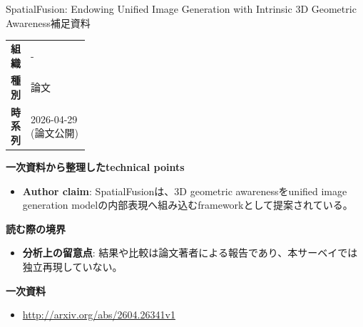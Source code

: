\begin{technicalnote}{SpatialFusion: Endowing Unified Image Generation with Intrinsic 3D Geometric Awareness}{補足資料}
\begingroup
\begin{tabularx}{\linewidth}{@{}>{\bfseries}p{0.22\linewidth}X@{}}
組織 & - \\
種別 & 論文 \\
時系列 & 2026-04-29 (論文公開) \\
\end{tabularx}
\smallskip
{\bfseries 一次資料から整理したtechnical points}
\begin{itemize}[leftmargin=1.5em,itemsep=0.35em]
\item \textbf{Author claim}: SpatialFusionは、3D geometric awarenessをunified image generation modelの内部表現へ組み込むframeworkとして提案されている。
\end{itemize}
{\bfseries 読む際の境界}
\begin{itemize}[leftmargin=1.5em,itemsep=0.35em]
\item \textbf{分析上の留意点}: 結果や比較は論文著者による報告であり、本サーベイでは独立再現していない。
\end{itemize}
\begin{samepage}
{\bfseries 一次資料}
\begingroup\sloppy
\begin{itemize}[leftmargin=1.5em,itemsep=0.25em]
\item {\scriptsize\url{http://arxiv.org/abs/2604.26341v1}}
\end{itemize}
\endgroup
\end{samepage}
\endgroup
\end{technicalnote}
\medskip

